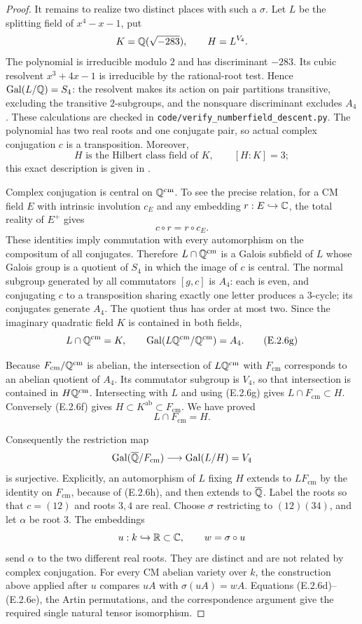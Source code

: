 \begin{proof}
It remains to realize two distinct places with such a $\sigma$. Let $L$ be the splitting field of $x^4-x-1$, put
\[
 K=\mathbb Q(\sqrt{-283}),\qquad H=L^{V_4}.
\]
The polynomial is irreducible modulo $2$ and has discriminant $-283$. Its cubic resolvent $x^3+4x-1$ is irreducible by the rational-root test. Hence $\operatorname{Gal}(L/\mathbb Q)=S_4$: the resolvent makes its action on pair partitions transitive, excluding the transitive $2$-subgroups, and the nonsquare discriminant excludes $A_4$. These calculations are checked in \texttt{code/verify\_numberfield\_descent.py}. The polynomial has two real roots and one conjugate pair, so actual complex conjugation $c$ is a transposition. Moreover,
\[
 H\text{ is the Hilbert class field of }K,
 \qquad [H:K]=3;
 \tag{E.2.6f}
\]
this exact description is given in \cite[Notes 5.4, p.~438]{GenSerreJordan2003}.

Complex conjugation is central on $\mathbb Q^{\mathrm{cm}}$. To see the precise relation, for a CM field $E$ with intrinsic involution $c_E$ and any embedding $r:E\hookrightarrow\mathbb C$, the total reality of $E^+$ gives
\[
 c\circ r=r\circ c_E.
\]
These identities imply commutation with every automorphism on the compositum of all conjugates. Therefore $L\cap\mathbb Q^{\mathrm{cm}}$ is a Galois subfield of $L$ whose Galois group is a quotient of $S_4$ in which the image of $c$ is central. The normal subgroup generated by all commutators $[g,c]$ is $A_4$: each is even, and conjugating $c$ to a transposition sharing exactly one letter produces a $3$-cycle; its conjugates generate $A_4$. The quotient thus has order at most two. Since the imaginary quadratic field $K$ is contained in both fields,
\[
 L\cap\mathbb Q^{\mathrm{cm}}=K,
 \qquad
 \operatorname{Gal}(L\mathbb Q^{\mathrm{cm}}/\mathbb Q^{\mathrm{cm}})=A_4.
 \tag{E.2.6g}
\]

Because $F_{\mathrm{cm}}/\mathbb Q^{\mathrm{cm}}$ is abelian, the intersection of $L\mathbb Q^{\mathrm{cm}}$ with $F_{\mathrm{cm}}$ corresponds to an abelian quotient of $A_4$. Its commutator subgroup is $V_4$, so that intersection is contained in $H\mathbb Q^{\mathrm{cm}}$. Intersecting with $L$ and using (E.2.6g) gives $L\cap F_{\mathrm{cm}}\subset H$. Conversely (E.2.6f) gives $H\subset K^{\mathrm{ab}}\subset F_{\mathrm{cm}}$. We have proved
\[
 L\cap F_{\mathrm{cm}}=H.
 \tag{E.2.6h}
\]

Consequently the restriction map
\[
 \operatorname{Gal}(\overline{\mathbb Q}/F_{\mathrm{cm}})\longrightarrow\operatorname{Gal}(L/H)=V_4
\]
is surjective. Explicitly, an automorphism of $L$ fixing $H$ extends to $LF_{\mathrm{cm}}$ by the identity on $F_{\mathrm{cm}}$, because of (E.2.6h), and then extends to $\overline{\mathbb Q}$. Label the roots so that $c=(12)$ and roots $3,4$ are real. Choose $\sigma$ restricting to $(12)(34)$, and let $\alpha$ be root $3$. The embeddings
\[
 u:k\hookrightarrow\mathbb R\subset\mathbb C,\qquad w=\sigma\circ u
\]
send $\alpha$ to the two different real roots. They are distinct and are not related by complex conjugation. For every CM abelian variety over $k$, the construction above applied after $u$ compares $uA$ with $\sigma(uA)=wA$. Equations (E.2.6d)--(E.2.6e), the Artin permutations, and the correspondence argument give the required single natural tensor isomorphism.
\end{proof}

